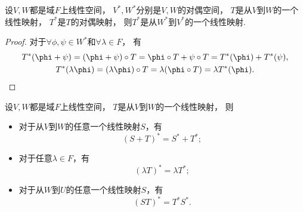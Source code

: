 \begin{proposition}
设\(V,W\)都是域\(F\)上线性空间，
\(V^*,W^*\)分别是\(V,W\)的对偶空间，
\(T\)是从\(V\)到\(W\)的一个线性映射，
\(T^*\)是\(T\)的对偶映射，
则\(T^*\)是从\(W^*\)到\(V^*\)的一个线性映射.
\begin{proof}
对于\(\forall \phi,\psi \in W^*\)和\(\forall \lambda \in F\)，
有\begin{gather*}
	T^*(\phi+\psi)
	= (\phi+\psi) \circ T
	= \phi \circ T + \psi \circ T
	= T^*(\phi) + T^*(\psi), \\
	T^*(\lambda\phi)
	= (\lambda\phi) \circ T
	= \lambda (\phi \circ T)
	= \lambda T^*(\phi).
	\qedhere
\end{gather*}
\end{proof}
\end{proposition}

\begin{property}
设\(V,W\)都是域\(F\)上线性空间，
\(T\)是从\(V\)到\(W\)的一个线性映射，
则\begin{itemize}
	\item 对于从\(V\)到\(W\)的任意一个线性映射\(S\)，有\begin{equation*}
		(S+T)^* = S^* + T^*;
	\end{equation*}
	\item 对于任意\(\lambda \in F\)，有\begin{equation*}
		(\lambda T)^* = \lambda T^*;
	\end{equation*}
	\item 对于从\(W\)到\(U\)的任意一个线性映射\(S\)，有\begin{equation*}
		(S T)^* = T^* S^*.
	\end{equation*}
\end{itemize}
\end{property}
